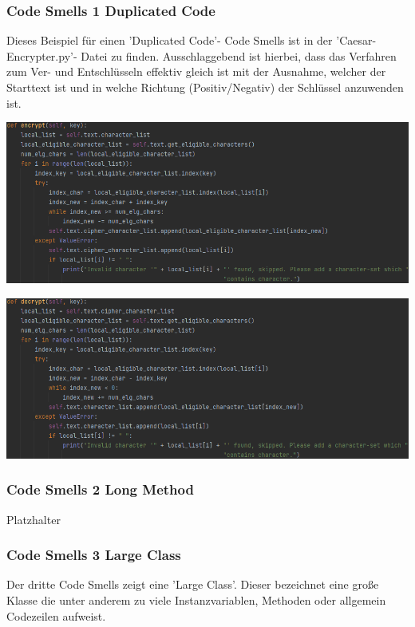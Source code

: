\documentclass[12pt]{article}
\begin{document}
\subsubsection{Code Smells 1 Duplicated Code}
Dieses Beispiel für einen 'Duplicated Code'- Code Smells ist in der 'Caesar-Encrypter.py'- Datei zu finden. Ausschlaggebend ist hierbei, dass das Verfahren zum Ver- und Entschlüsseln effektiv gleich ist mit der Ausnahme, welcher der Starttext ist und in welche Richtung (Positiv/Negativ) der Schlüssel anzuwenden ist.
\begin{center}
	\includegraphics[width=15cm]{bilder/CodeSmells1_a.png}
\end{center}
\begin{center}
	\includegraphics[width=15cm]{bilder/CodeSmells1_b.png}
\end{center}

\subsubsection{Code Smells 2 Long Method}
Platzhalter

\subsubsection{Code Smells 3 Large Class}
Der dritte Code Smells zeigt eine 'Large Class'. Dieser bezeichnet eine große Klasse die unter anderem zu viele Instanzvariablen, Methoden oder allgemein Codezeilen aufweist.
\end{document}
